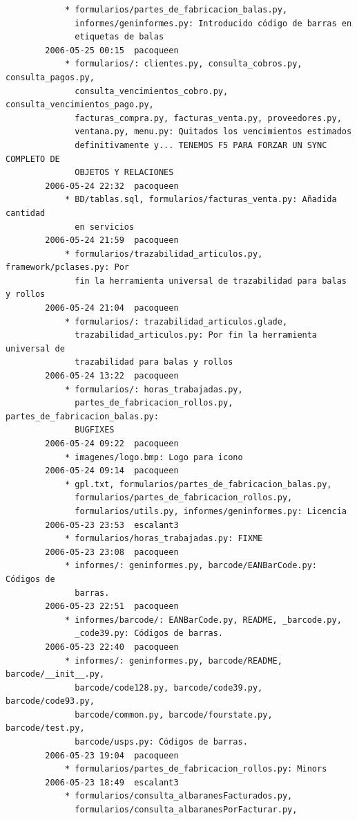\documentclass[a4paper]{article}
\begin{document}
\begin{verbatim}
            * formularios/partes_de_fabricacion_balas.py,
              informes/geninformes.py: Introducido código de barras en
              etiquetas de balas
        2006-05-25 00:15  pacoqueen
            * formularios/: clientes.py, consulta_cobros.py, consulta_pagos.py,
              consulta_vencimientos_cobro.py, consulta_vencimientos_pago.py,
              facturas_compra.py, facturas_venta.py, proveedores.py,
              ventana.py, menu.py: Quitados los vencimientos estimados
              definitivamente y... TENEMOS F5 PARA FORZAR UN SYNC COMPLETO DE
              OBJETOS Y RELACIONES
        2006-05-24 22:32  pacoqueen
            * BD/tablas.sql, formularios/facturas_venta.py: Añadida cantidad
              en servicios
        2006-05-24 21:59  pacoqueen
            * formularios/trazabilidad_articulos.py, framework/pclases.py: Por
              fin la herramienta universal de trazabilidad para balas y rollos
        2006-05-24 21:04  pacoqueen
            * formularios/: trazabilidad_articulos.glade,
              trazabilidad_articulos.py: Por fin la herramienta universal de
              trazabilidad para balas y rollos
        2006-05-24 13:22  pacoqueen
            * formularios/: horas_trabajadas.py,
              partes_de_fabricacion_rollos.py, partes_de_fabricacion_balas.py:
              BUGFIXES
        2006-05-24 09:22  pacoqueen
            * imagenes/logo.bmp: Logo para icono
        2006-05-24 09:14  pacoqueen
            * gpl.txt, formularios/partes_de_fabricacion_balas.py,
              formularios/partes_de_fabricacion_rollos.py,
              formularios/utils.py, informes/geninformes.py: Licencia
        2006-05-23 23:53  escalant3
            * formularios/horas_trabajadas.py: FIXME
        2006-05-23 23:08  pacoqueen
            * informes/: geninformes.py, barcode/EANBarCode.py: Códigos de
              barras. 
        2006-05-23 22:51  pacoqueen
            * informes/barcode/: EANBarCode.py, README, _barcode.py,
              _code39.py: Códigos de barras. 
        2006-05-23 22:40  pacoqueen
            * informes/: geninformes.py, barcode/README, barcode/__init__.py,
              barcode/code128.py, barcode/code39.py, barcode/code93.py,
              barcode/common.py, barcode/fourstate.py, barcode/test.py,
              barcode/usps.py: Códigos de barras. 
        2006-05-23 19:04  pacoqueen
            * formularios/partes_de_fabricacion_rollos.py: Minors
        2006-05-23 18:49  escalant3
            * formularios/consulta_albaranesFacturados.py,
              formularios/consulta_albaranesPorFacturar.py,

\end{verbatim}
\end{document}
